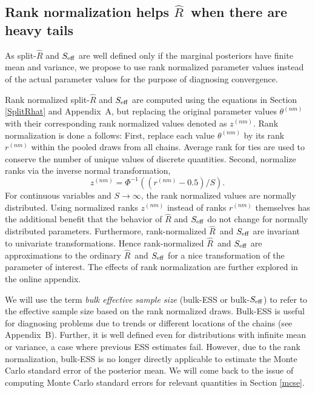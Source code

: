 \documentclass[american,]{article}
\newcommand{\Rhat}{$\widehat{R}$}
\theoremstyle{definition}
\begin{document}
\hypertarget{rank-normalization}{%
\subsection{Rank normalization helps  \Rhat\ when there are heavy tails}\label{rank-normalization}}

As split-\(\widehat{R}\) and \(S_{\rm eff}\) are well defined
only if the marginal posteriors have finite mean and variance, we
propose to use rank normalized parameter values instead of the actual
parameter values for the purpose of diagnosing convergence.

Rank normalized split-\(\widehat{R}\) and \(S_{\rm eff}\) are
computed using the equations in Section \ref{SplitRhat} and Appendix~A, but
replacing the original parameter values \(\theta^{(nm)}\) with their
corresponding rank normalized values denoted as \(z^{(nm)}\). Rank
normalization is done a follows: First, replace each value
\(\theta^{(nm)}\) by its rank \(r^{(nm)}\) within the pooled draws from all chains.
 Average rank for ties are
used to conserve the number of unique values of discrete quantities.
 Second, normalize ranks via the inverse normal transformation,
\begin{equation}
z^{(nm)} = \Phi^{-1}((r^{(nm)}-0.5)/S).
\end{equation}
For continuous variables and \(S \rightarrow \infty\), the rank
normalized values are normally distributed. Using normalized ranks
\(z^{(nm)}\) instead of ranks \(r^{(nm)}\) themselves has the additional
benefit that the behavior of \(\widehat{R}\) and \(S_{\rm eff}\) do
not change for normally distributed parameters.  Furthermore, rank-normalized \Rhat\ and \(S_{\rm eff}\) are invariant to univariate transformations. Hence    
rank-normalized \Rhat\ and \(S_{\rm eff}\) are approximations to the ordinary \Rhat\ and \(S_{\rm eff}\) for a nice transformation of the parameter of interest.
The effects of rank normalization are further explored in the online appendix.

We will use the term \emph{bulk effective sample size} (bulk-ESS or
bulk-\(S_{\rm eff}\)) to refer to the effective sample size based on the
rank normalized draws. Bulk-ESS is useful for diagnosing problems due to
trends or different locations of the chains (see Appendix~B). Further, it is
well defined even for distributions with infinite mean or variance, a
case where previous ESS estimates fail. However, due to the rank
normalization, bulk-ESS is no longer directly applicable to estimate the
Monte Carlo standard error of the posterior mean. We will come back to
the issue of computing Monte Carlo standard errors for relevant
quantities in Section \ref{mcse}.
\end{document}
